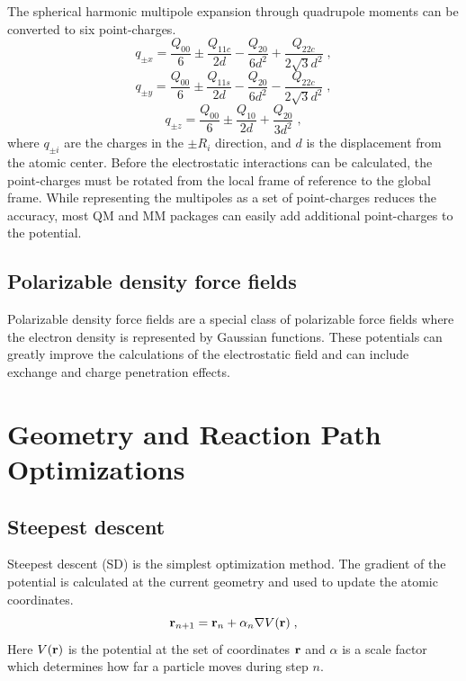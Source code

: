 \documentclass[12pt]{report}
\begin{document}
The spherical harmonic multipole expansion through quadrupole moments can be
converted to six point-charges. \cite{}
\begin{equation}
 q_{\pm x} = \frac{Q_{00}}{6} \pm \frac{Q_{11c}}{2d} -
          \frac{Q_{20}}{6d^2} + \frac{Q_{22c}}{2\sqrt{3}d^2} \; ,
\end{equation}
\begin{equation}
 q_{\pm y} = \frac{Q_{00}}{6} \pm \frac{Q_{11s}}{2d} -
          \frac{Q_{20}}{6d^2} - \frac{Q_{22c}}{2\sqrt{3}d^2} \; ,
\end{equation}
\begin{equation}
 q_{\pm z} = \frac{Q_{00}}{6} \pm \frac{Q_{10}}{2d} +
          \frac{Q_{20}}{3d^2} \; ,
\end{equation}
where $q_{\pm i}$ are the charges in the $\pm R_i$ direction, and $d$ is the
displacement from the atomic center.
Before the electrostatic interactions can be calculated, the point-charges
must be rotated from the local frame of reference to the global frame.
While representing the multipoles as a set of point-charges reduces the
accuracy, most QM and MM packages can easily add additional point-charges to
the potential.

\subsection{Polarizable density force fields}

Polarizable density force fields are a special class of polarizable force
fields where the electron density is represented by Gaussian functions.
These potentials can greatly improve the calculations of the electrostatic
field and can include exchange and charge penetration effects.

\section{Geometry and Reaction Path Optimizations}

\subsection{Steepest descent}

Steepest descent (SD) is the simplest optimization method.
The gradient of the potential is calculated at the current geometry and used
to update the atomic coordinates.
\begin{equation}
 {\textbf r}_{n+1} = {\textbf r}_n+\alpha_n \nabla V({\textbf r}) \; ,
\end{equation}
Here $V({\textbf r})$ is the potential at the set of coordinates
${\textbf r}$ and $\alpha$ is a scale factor which determines how far a
particle moves during step $n$. \\
\end{document}
